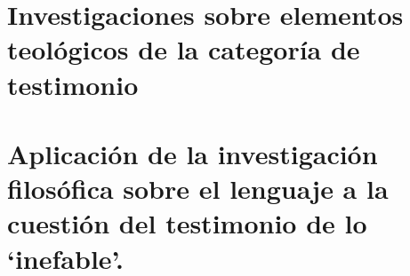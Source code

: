 

\section{Investigaciones sobre elementos teológicos de la categoría de testimonio}



\setcounter{subsubsection}{1}


\setcounter{subsubsection}{2}


\setcounter{subsubsection}{3}


\setcounter{subsubsection}{4}



\section{Aplicación de la investigación filosófica sobre el lenguaje a la cuestión del testimonio de lo `inefable'.}




%

%

